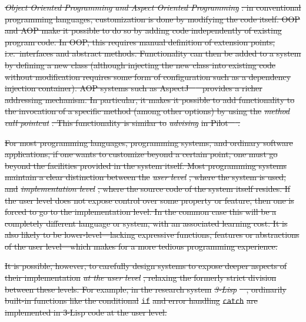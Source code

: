 \documentclass[english,submission]{programming}
\providecommand{\DIFdel}[1]{{\protect\color{red}\sout{#1}}}                      %
\begin{document}
\emph{\DIFdel{Object Oriented Programming and Aspect Oriented Programming}}%
\DIFdel{: in
conventional programming languages, customization is done by modifying
the code itself. OOP and AOP make it possible to do so by adding code
independently of existing program code. In OOP, this requires manual
definition of extension points, i.e.~interfaces and abstract methods.
Functionality can then be added to a system by defining a new class
(although injecting the new class into existing code without
modification requires some form of configuration such as a dependency
injection container). AOP systems such as AspectJ \mbox{%
\cite{AspectJ}
}\hspace{0pt}%
provides a richer addressing mechanism. In particular, it makes it
possible to add functionality to the invocation of a specific method
(among other options) by using the }\emph{\DIFdel{method call pointcut}}%
\DIFdel{. This
functionality is similar to }\emph{\DIFdel{advising}} %
\DIFdel{in Pilot \mbox{%
\cite{Pilot}}\hspace{0pt}%
.
}%


\DIFdel{For most programming languages, programming systems, and ordinary
software applications, if one wants to customize beyond a certain point,
one must go beyond the facilities provided in the system itself. Most
programming systems maintain a clear distinction between the }\emph{\DIFdel{user
level}}%
\DIFdel{, where the system is used, and }\emph{\DIFdel{implementation level}}%
\DIFdel{, where
the source code of the system itself resides. If the user level does not
expose control over some property or feature, then one is forced to go
to the implementation level. In the common case this will be a
completely different language or system, with an associated learning
cost. It is also likely to be lower-level---lacking expressive
functions, features or abstractions of the user level---which makes for
a more tedious programming experience.
}%

\DIFdel{It is possible, however, to carefully design systems to expose deeper
aspects of their implementation }\emph{\DIFdel{at the user level}}%
\DIFdel{, relaxing the
formerly strict division between these levels. For example, in the
research system }\emph{\DIFdel{3-Lisp}} %
\DIFdel{\mbox{%
\cite{PRinPLs}}\hspace{0pt}%
, ordinarily built-in
functions like the conditional }\texttt{\DIFdel{if}} %
\DIFdel{and error handling
}\texttt{\DIFdel{catch}} %
\DIFdel{are implemented in 3-Lisp code at the user level.
}%
\end{document}
